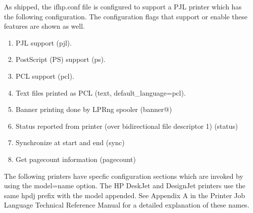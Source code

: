 \documentclass[a4paper]{article}
\begin{document}
As shipped,
the
{\ttfamily ifhp.conf}
file is configured to support a PJL printer which has
the following configuration.
The configuration flags that support or enable these
features are shown as well.
\begin{enumerate}
\item  PJL support ({\ttfamily pjl}).
\item  PostScript (PS) support ({\ttfamily ps}).
\item  PCL support ({\ttfamily pcl}).
\item  Text files printed as PCL ({\ttfamily text}, {\ttfamily default\_language=pcl}).
\item  Banner printing done by LPRng spooler ({\ttfamily banner@})
\item  Status reported from printer (over bidirectional file descriptor 1)  ({\ttfamily status})
\item  Synchronize at start and end ({\ttfamily sync})
\item  Get pagecount information ({\ttfamily pagecount})
\end{enumerate}


The following printers have specfic configuration sections
which are invoked by using the
{\ttfamily model=name}
option.
The HP DeskJet and DesignJet printers use the same
{\ttfamily hpdj} prefix with the model appended.
See Appendix A in the Printer Job Language Technical Reference Manual
for a detailed explanation of these names.
\end{document}
